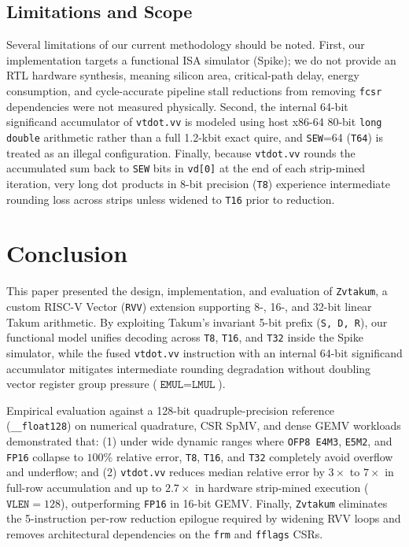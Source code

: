\documentclass[conference]{IEEEtran}
\begin{document}
\subsection{Limitations and Scope}
\label{sec:limitations}
Several limitations of our current methodology should be noted. First, our implementation targets a functional ISA simulator (Spike); we do not provide an RTL hardware synthesis, meaning silicon area, critical-path delay, energy consumption, and cycle-accurate pipeline stall reductions from removing \texttt{fcsr} dependencies were not measured physically. Second, the internal 64-bit significand accumulator of \texttt{vtdot.vv} is modeled using host x86-64 80-bit \texttt{long double} arithmetic rather than a full 1.2-kbit exact quire, and \texttt{SEW}=64 (\texttt{T64}) is treated as an illegal configuration. Finally, because \texttt{vtdot.vv} rounds the accumulated sum back to \texttt{SEW} bits in \texttt{vd[0]} at the end of each strip-mined iteration, very long dot products in 8-bit precision (\texttt{T8}) experience intermediate rounding loss across strips unless widened to \texttt{T16} prior to reduction.

\section{Conclusion}
\label{sec:conclusion}

This paper presented the design, implementation, and evaluation of \texttt{Zvtakum}, a custom RISC-V Vector (\texttt{RVV}) extension supporting 8-, 16-, and 32-bit linear Takum arithmetic. By exploiting Takum's invariant 5-bit prefix (\texttt{S, D, R}), our functional model unifies decoding across \texttt{T8}, \texttt{T16}, and \texttt{T32} inside the Spike simulator, while the fused \texttt{vtdot.vv} instruction with an internal 64-bit significand accumulator mitigates intermediate rounding degradation without doubling vector register group pressure ($\texttt{EMUL} = \texttt{LMUL}$).

Empirical evaluation against a 128-bit quadruple-precision reference (\texttt{\_\_float128}) on numerical quadrature, CSR SpMV, and dense GEMV workloads demonstrated that: (1) under wide dynamic ranges where \texttt{OFP8 E4M3}, \texttt{E5M2}, and \texttt{FP16} collapse to $100\%$ relative error, \texttt{T8}, \texttt{T16}, and \texttt{T32} completely avoid overflow and underflow; and (2) \texttt{vtdot.vv} reduces median relative error by $3\times$ to $7\times$ in full-row accumulation and up to $2.7\times$ in hardware strip-mined execution ($\texttt{VLEN}=128$), outperforming \texttt{FP16} in 16-bit GEMV. Finally, \texttt{Zvtakum} eliminates the 5-instruction per-row reduction epilogue required by widening RVV loops and removes architectural dependencies on the \texttt{frm} and \texttt{fflags} CSRs.
\end{document}

